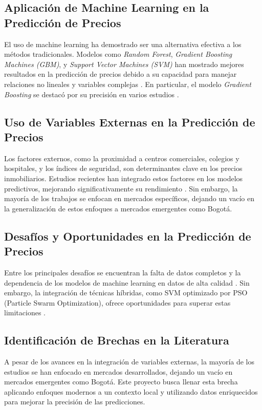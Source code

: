 \subsection{Aplicación de Machine Learning en la Predicción de Precios}
El uso de machine learning ha demostrado ser una alternativa efectiva a los métodos tradicionales. Modelos como \textit{Random Forest}, \textit{Gradient Boosting Machines (GBM)}, y \textit{Support Vector Machines (SVM)} han mostrado mejores resultados en la predicción de precios debido a su capacidad para manejar relaciones no lineales y variables complejas \cite{park2015housing, zhang2018realestate}. En particular, el modelo \textit{Gradient Boosting} se destacó por su precisión en varios estudios \cite{bigdata2019realestate}.

\subsection{Uso de Variables Externas en la Predicción de Precios}
Los factores externos, como la proximidad a centros comerciales, colegios y hospitales, y los índices de seguridad, son determinantes clave en los precios inmobiliarios. Estudios recientes han integrado estos factores en los modelos predictivos, mejorando significativamente su rendimiento \cite{li2017realestate, mostofi2022realestate}. Sin embargo, la mayoría de los trabajos se enfocan en mercados específicos, dejando un vacío en la generalización de estos enfoques a mercados emergentes como Bogotá.

\subsection{Desafíos y Oportunidades en la Predicción de Precios}
Entre los principales desafíos se encuentran la falta de datos completos y la dependencia de los modelos de machine learning en datos de alta calidad \cite{yu2016realestate}. Sin embargo, la integración de técnicas híbridas, como SVM optimizado por PSO (Particle Swarm Optimization), ofrece oportunidades para superar estas limitaciones \cite{zhang2018realestate}.

\subsection{Identificación de Brechas en la Literatura}
A pesar de los avances en la integración de variables externas, la mayoría de los estudios se han enfocado en mercados desarrollados, dejando un vacío en mercados emergentes como Bogotá. Este proyecto busca llenar esta brecha aplicando enfoques modernos a un contexto local y utilizando datos enriquecidos para mejorar la precisión de las predicciones.


